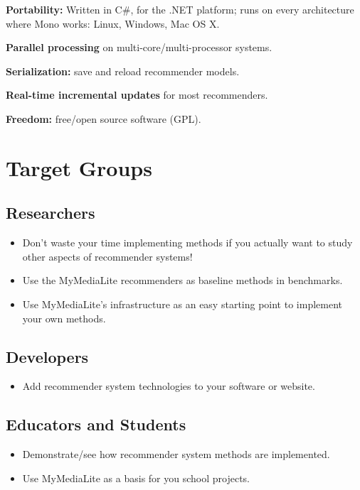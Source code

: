 \documentclass[a4paper, foldmark, 12pt]{leaflet}
\begin{document}
\textbf{Portability:}
	Written in C\#, for the .NET platform;
    runs on every architecture where Mono works: Linux, Windows, Mac OS X.

\textbf{Parallel processing} on multi-core/multi-processor systems.

\textbf{Serialization:} save and reload recommender models.

\textbf{Real-time incremental updates} for most recommenders.

\textbf{Freedom:} free/open source software (GPL).

\newpage

\section{Target Groups}

\subsection{Researchers}
\begin{itemize}
	\item Don't waste your time implementing methods if you actually want to study
	      other aspects of recommender systems!
	\item Use the MyMediaLite recommenders as baseline methods in benchmarks.
	\item Use MyMediaLite's infrastructure as an easy starting point to implement your own methods.
\end{itemize}

\subsection{Developers}
\begin{itemize}
	\item Add recommender system technologies to your software or website.
\end{itemize}

\subsection{Educators and Students}
\begin{itemize}
	\item Demonstrate/see how recommender system methods are implemented.
	\item Use MyMediaLite as a basis for you school projects.
\end{itemize}
\end{document}
